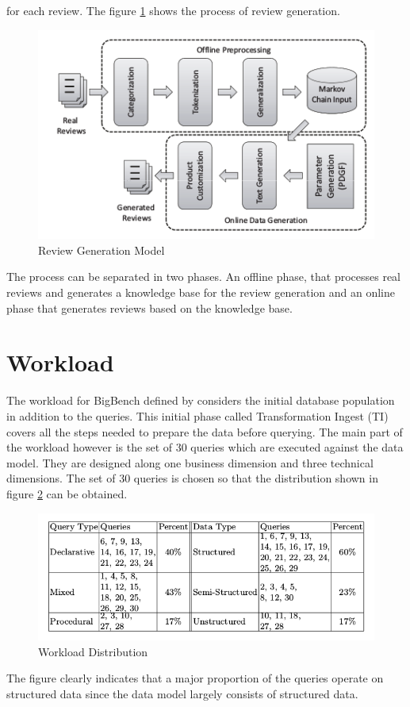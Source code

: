 \documentclass[12pt]{book}
\begin{document}
for each review.
The figure \ref{review} shows the process of review generation.
\begin{figure}[hb]
 \centering
 \includegraphics[width=15cm]{review.png}
 \caption{Review Generation Model \label{review} \cite{ghazal}}
\end{figure}
The process can be separated in two phases. An offline phase, that processes real reviews and generates a knowledge 
base for the review generation and an online phase that generates reviews based on the knowledge base.

\section{Workload}
The workload for BigBench defined by \cite{springe} considers the initial database population in addition to the queries. This initial 
phase called Transformation Ingest (TI) covers all the steps needed to prepare the data before querying.
The main part of the workload however is the set of 30 queries which are executed against the data model. They are designed along one business
dimension and three technical dimensions.
The set of 30 queries is chosen so that the distribution shown in figure \ref{workload} can be obtained.
\begin{figure}[h]
 \centering
 \includegraphics[width=13cm]{workload.png}
 \caption{Workload Distribution \label{workload} \cite{springer}}
\end{figure}
The figure clearly indicates that a major proportion of the queries operate on structured data since the data model largely consists of 
structured data.
\end{document}
